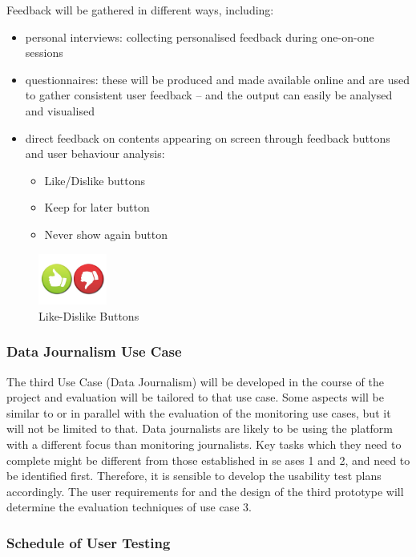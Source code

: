 Feedback will be gathered in different ways, including:
\begin{itemize}
\item personal interviews: collecting personalised feedback during one-on-one sessions
\item questionnaires: these will be produced and made available online and are used to gather consistent user feedback – and the output can easily be analysed and visualised 
\item direct feedback on contents appearing on screen through feedback buttons and user behaviour analysis:
\begin{itemize}
\item Like/Dislike buttons
\item Keep for later button
\item Never show again button 
\end{itemize}
\end{itemize}

\begin{figure}[ht]
    \centering
    \includegraphics[width=0.2\textwidth]{./images/like_dislike.jpg}
    \caption{Like-Dislike Buttons}
    \label{fig:like-dislike}
\end{figure}


\subsubsection{Data Journalism Use Case}
The third Use Case (Data Journalism) will be developed in the course of the project and evaluation will be tailored to that use case. Some aspects will be similar to or in parallel with the evaluation of the monitoring use cases, but it will not be limited to that. Data journalists are likely to be using the \SUMMA platform with a different focus than monitoring journalists. Key tasks which they need to complete might be different from those established in se ases 1 and 2, and need to be identified first. Therefore, it is sensible to develop the usability test plans accordingly. The user requirements for and the design of the third prototype will determine the evaluation techniques of use case 3.

\subsubsection{Schedule of User Testing}


